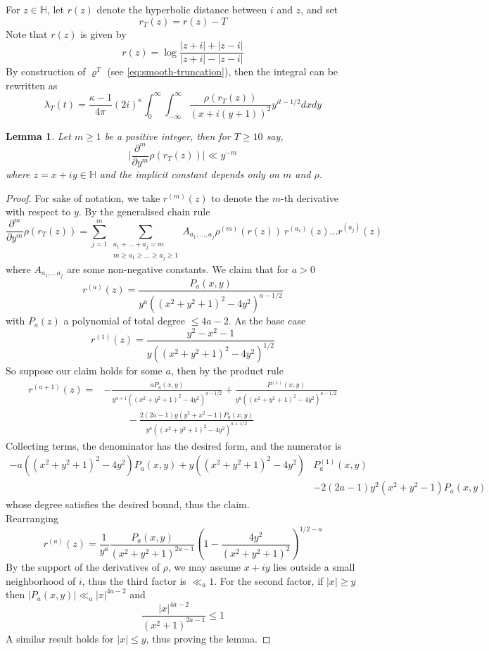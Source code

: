\documentclass{article}
\newtheorem{lemma}[theorem]{Lemma}
\numberwithin{equation}{section}
\begin{document}
\bigbreak For $z \in \mathbb{H}$, let $r(z)$ denote the hyperbolic distance between $i$ and $z$, and set
$$r_T(z)=r(z)-T$$
Note that $r(z)$ is given by
$$r(z) = \log\frac{|z+i|+|z-i|}{|z+i|-|z-i|}$$
By construction of $\varrho^T$ (see \eqref{eq:smooth-truncation}), then the integral can be rewritten as 
\begin{equation}\label{eq:eigenvalue}
    \lambda_{T}(t)=\frac{\kappa-1}{4\pi}(2i)^\kappa\int_{0}^{\infty}\int_{-\infty}^{\infty}\frac{\rho(r_T(z))}{(x+i(y+1))^2}y^{it-1/2}dxdy
\end{equation}
\begin{lemma}\label{lemma:derivativebound}
    Let $m\geq 1$ be a positive integer, then for $T\geq 10$ say,
    \begin{equation}\Bigr|\frac{\partial^m}{\partial y^m}\rho(r_T(z))\Bigr|\ll y^{-m}
    \end{equation}
    where $z=x+iy \in\mathbb{H} $ and the implicit constant depends only on $m$ and $\rho$.
\end{lemma}
\begin{proof}
    For sake of notation, we take $r^{(m)}(z)$ to denote the $m$-th derivative with respect to $y$. By the generalised chain rule 
    $$\frac{\partial^m}{\partial y^m}\rho(r_T(z))=\sum_{j=1}^{m}\sum_{\substack{a_1+...+a_j=m \\m\geq a_1\geq ... \geq a_j \geq 1 }}A_{a_1,...,a_j}\rho^{(m)}(r(z))\ r^{(a_1)}(z)...r^{(a_j)}(z)$$
    where $A_{a_1,...a_j}$ are some non-negative constants. We claim that for $a>0$
    $$r^{(a)}(z)=\frac{P_a(x,y)}{y^a((x^2+y^2+1)^2-4y^2)^{a-1/2}}$$
    with $P_a(z)$ a polynomial of total degree $\leq 4a-2$.
    As the base case
    $$r^{(1)}(z)=\frac{y^2-x^2-1}{y((x^2+y^2+1)^2-4y^2)^{1/2}}$$
    So suppose our claim holds for some $a$, then by the product rule
    \begin{align*}
            r^{(a+1)}(z)  = & -\frac{aP_a(x,y)}{y^{a+1}((x^2+y^2+1)^2-4y^2)^{a-1/2}}+\frac{P^{(1)}(x,y)}{y^{a}((x^2+y^2+1)^2-4y^2)^{a-1/2}} \\
            & \hspace{1cm} -\frac{2(2a-1)y(y^2+x^2-1)P_a(x,y)}{y^a((x^2+y^2+1)^2-4y^2)^{a+1/2}}
    \end{align*}
    Collecting terms, the denominator has the desired form, and the numerator is
    \begin{align*}
        -a((x^2+y^2+1)^2-4y^2)P_{a}(x,y)+y((x^2+y^2+1)^2-4y^2)& P_a^{(1)}(x,y) \\ 
        & -2(2a-1)y^2(x^2+y^2-1)P_a(x,y)
    \end{align*}
    whose degree satisfies the desired bound, thus the claim.\\
    Rearranging
    $$r^{(a)}(z)=\frac{1}{y^a}\frac{P_a(x,y)}{(x^2+y^2+1)^{2a-1}}\left(1-\frac{4y^2}{(x^2+y^2+1)^2}\right)^{1/2-a}$$
    By the support of the derivatives of $\rho$, we may assume $x+iy$ lies outside a small neighborhood of $i$, thus the third factor is $\ll_a 1$. For the second factor, if $|x|\geq y$ then $|P_a(x,y)|\ll_a |x|^{4a-2}$ and 
    $$\frac{|x|^{4a-2}}{(x^2+1)^{2a-1}}\leq 1$$
    A similar result holds for $|x| \leq y$, thus proving the lemma.
\end{proof}
\end{document}
